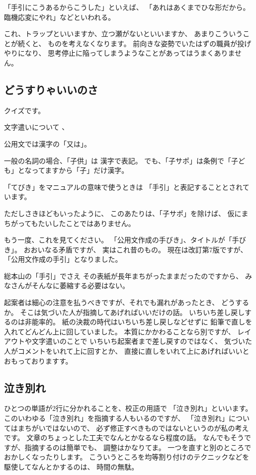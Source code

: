 \documentclass[uplatex,jis2004,dvipdfmx,12pt]{jsarticle}
\begin{document}
「手引にこうあるからこうした」といえば、
「あれはあくまでひな形だから。臨機応変にやれ」などといわれる。


これ、トラップといいますか、立つ瀬がないといいますか、
あまりこういうことが続くと、
ものを考えなくなります。
前向きな姿勢でいたはずの職員が投げやりになり、
思考停止に陥ってしまうようなことがあってはうまくありません。
\fi

\subsection{どうすりゃいいのさ}


クイズです。

文字遣いについて
、

公用文では漢字の「又は」。

一般の名詞の場合、「子供」は
漢字で表記。
でも、「子サポ」は条例で「子ども」となってますから「子」だけ漢字。



「てびき」をマニュアルの意味で使うときは
「手引」と表記することとされています。

ただしさきほどもいったように、
このあたりは、「子サポ」を除けば、
仮にまちがってもたいしたことではありません。

もう一度、これを見てください。
「公用文作成の手びき」、タイトルが「手びき」。
おおいなる矛盾ですが、
実はこれ昔のもの。
現在は改訂第7版ですが、
「公用文作成の手引」となりました。

総本山の「手引」でさえ
その表紙が長年まちがったままだったのですから、
みなさんがそんなに萎縮する必要はない。


起案者は細心の注意を払うべきですが、それでも漏れがあったとき、
どうするか。
そこは気づいた人が指摘してあげればいいだけの話。
いちいち差し戻しするのは非能率的。
紙の決裁の時代はいちいち差し戻しなどせずに
鉛筆で直しを入れてどんどん上に回していました。
本質にかかわることなら別ですが、
レイアウトや文字遣いのことで
いちいち起案者まで差し戻すのではなく、
気づいた人がコメントをいれて上に回すとか、
直接に直しをいれて上にあげればいいとおもっておりますす。




\subsection{泣き別れ}
ひとつの単語が2行に分かれることを、校正の用語で
「泣き別れ」といいます。
このいわゆる「泣き別れ」を指摘する人もいるのですが、
「泣き別れ」についてはまちがいではないので、
必ず修正すべきものではないというのが私の考えです。
文章のちょっとした工夫でなんとかなるなら程度の話。
なんでもそうですが、指摘するのは簡単でも、
調整はかなりてま。
一つを直すと別のところでおかしくなったりします。
こういうところを均等割り付けのテクニックなどを駆使してなんとかするのは、
時間の無駄。
\end{document}
